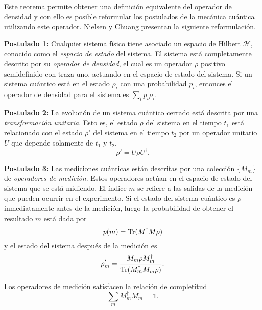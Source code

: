 Este teorema  permite obtener una definición equivalente del operador de densidad y con ello es posible reformular los postulados de la mecánica cuántica utilizando este operador. Nielsen y Chuang {\cite{nielsen_chuang_2010}} presentan la siguiente reformulación.


\setlength{\leftskip}{1cm}

 \textbf{Postulado 1:} Cualquier sistema físico tiene asociado un espacio de Hilbert $\mathcal{H}$, conocido como el \textit{espacio de estado} del sistema. El sistema está completamente descrito por su \textit{operador de densidad}, el cual es un operador $\rho$ positivo semidefinido con traza uno, actuando en el espacio de estado del sistema. Si un sistema cuántico está en el estado $\rho_i$ con una probabilidad $p_i$, entonces el operador de densidad para el sistema es $\sum_{i}p_i\rho_i$.


\textbf{Postulado 2:} La evolución de un sistema cuántico cerrado está descrita por una \textit{transformación unitaria}. Esto es, el estado $\rho$ del sistema en el tiempo $t_1$ está relacionado con el estado $\rho'$ del sistema en el tiempo $t_2$ por un operador unitario $U$ que depende solamente de $t_1$ y $t_2$, \begin{equation}\label{postulado 2}
\rho'=U\rho U^{\dagger}.
\end{equation}


\textbf{Postulado 3:} Las mediciones cuánticas están descritas por una colección $\{M_m\}$ de \textit{operadores de medición}. Estos operadores actúan en el espacio de estado del sistema que se está midiendo. El índice $m$ se refiere a las salidas de la medición que pueden ocurrir en el experimento. Si el estado del sistema cuántico es $\rho$ inmediatamente antes de la medición, luego la probabilidad de obtener el resultado $m$ está dada por \begin{equation}\label{probaility3postulate}
	p(m)={\rm Tr}(M^\dagger M \rho)
\end{equation} y el estado del sistema después de la medición es  \begin{equation}\label{state3postulate}
	\rho_m'=\dfrac{M_m\rho M_m^\dagger}{{\rm Tr}(M_m^\dagger M_m \rho)}.
\end{equation}

Los operadores de medición satisfacen la relación de completitud \begin{equation}\label{completitud3postulate}
	  	\sum_m M_m^\dagger M_m=\mathds{1}.
\end{equation}

